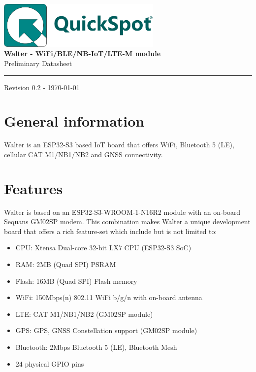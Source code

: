 \documentclass[11pt]{article}
\newcommand{\dptproduct}{Walter - WiFi/BLE/NB-IoT/LTE-M module}
\begin{document}
\begin{titlepage}
\hfill\includegraphics[width=8cm]{logo.pdf}\\

\hfill {\bf \Large  \dptproduct}\\[-3mm]

\hfill {\Large Preliminary Datasheet}

\vfill
\rule{487pt}{1pt}

\hfill Revision 0.2 - \today
\end{titlepage}
\section{General information}
Walter is an ESP32-S3 based IoT board that offers WiFi, Bluetooth 5 (LE), cellular CAT M1/NB1/NB2 and GNSS connectivity. 

\section{Features}
Walter is based on an ESP32-S3-WROOM-1-N16R2 module with an on-board Sequans GM02SP modem.
This combination makes Walter a unique development board that offers a rich feature-set which include but is not limited to:
\begin{itemize}
	\item CPU: Xtensa Dual-core 32-bit LX7 CPU (ESP32-S3 SoC)
	\item RAM: 2MB (Quad SPI) PSRAM
	\item Flash: 16MB (Quad SPI) Flash memory
	\item WiFi: 150Mbps(n) 802.11 WiFi b/g/n with on-board antenna
	\item LTE: CAT M1/NB1/NB2 (GM02SP module)
	\item GPS: GPS, GNSS Constellation support (GM02SP module)
	\item Bluetooth: 2Mbps Bluetooth 5 (LE), Bluetooth Mesh
	\item 24 physical GPIO pins 
\end{itemize}
\end{document}
